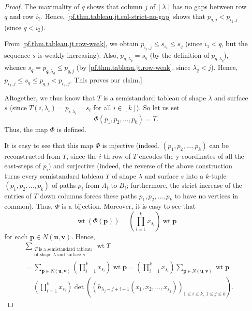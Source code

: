 \documentclass[reqno]{amsart}
\newcommand{\0}{\phantom{c}}
\let\sumnonlimits\sum
\let\prodnonlimits\prod
\renewcommand{\sum}{\sumnonlimits\limits}
\renewcommand{\prod}{\prodnonlimits\limits}
\theoremstyle{plain}
\theoremstyle{definition}
\numberwithin{equation}{section}
\begin{document}
\begin{proof}
The maximality of $q$ shows that column $j$ of $\left[  \lambda\right]  $ has
no gaps between row $q$ and row $i_{2}$. Hence,
\eqref{pf.thm.tableau.jt.col-strict-no-gap} shows that $p_{q,j}<p_{i_{2},j}$
(since $q<i_{2}$).

From \eqref{pf.thm.tableau.jt.row-weak}, we obtain $p_{i_{1},j}\leq s_{i_{1}%
}\leq s_{q}$ (since $i_{1}<q$, but the sequence $s$ is weakly increasing).
Also, $p_{q,\lambda_{q}}=s_{q}$ (by the definition of $p_{q,\lambda_{q}}$),
whence $s_{q}=p_{q,\lambda_{q}}\leq p_{q,j}$ (by
\eqref{pf.thm.tableau.jt.row-weak}, since $\lambda_{q}<j$). Hence,
$p_{i_{1},j}\leq s_{q}\leq p_{q,j}<p_{i_{2},j}$. This proves our claim.]

Altogether, we thus know that $T$ is a semistandard tableau of shape $\lambda$
and surface $s$ (since $T\left(  i,\lambda_{i}\right)  =p_{i,\lambda_{i}%
}=s_{i}$ for all $i\in\left[  k\right]  $). So let us set%
\[
\Phi\left(  p_{1},p_{2},\ldots,p_{k}\right)  =T.
\]
Thus, the map $\Phi$ is defined.

It is easy to see that this map $\Phi$ is injective (indeed, $\left(
p_{1},p_{2},\ldots,p_{k}\right)  $ can be reconstructed from $T$, since the
$i$-th row of $T$ encodes the y-coordinates of all the east-steps of $p_{i}$)
and surjective (indeed, the reverse of the above construction turns every
semistandard tableau $T$ of shape $\lambda$ and surface $s$ into a $k$-tuple
$\left(  p_{1},p_{2},\ldots,p_{k}\right)  $ of paths $p_{i}$ from $A_{i}$ to
$B_{i}$; furthermore, the strict increase of the entries of $T$ down columns
forces these paths $p_{1},p_{2},\ldots,p_{k}$ to have no vertices in common).
Thus, $\Phi$ is a bijection. Moreover, it is easy to see that
\[
\operatorname*{wt}\left(  \Phi\left(  \mathbf{p}\right)  \right)  =\left(
\prod_{i=1}^{k}x_{s_{i}}\right)  \operatorname*{wt}\mathbf{p}%
\]
for each $\mathbf{p}\in N\left(  \mathbf{u},\mathbf{v}\right)  $. Hence,%
\begin{align*}
&  \sum_{\substack{T\text{ is a semistandard tableau}\\\text{of shape }%
\lambda\text{ and surface }s}}\operatorname*{wt}T\\
&  =\sum_{\mathbf{p}\in N\left(  \mathbf{u},\mathbf{v}\right)  }\left(
\prod_{i=1}^{k}x_{s_{i}}\right)  \operatorname*{wt}\mathbf{p}=\left(
\prod_{i=1}^{k}x_{s_{i}}\right)  \sum_{\mathbf{p}\in N\left(  \mathbf{u}%
,\mathbf{v}\right)  }\operatorname*{wt}\mathbf{p}\\
&  =\left(  \prod_{i=1}^{k}x_{s_{i}}\right)  \det\left(  \left(
h_{\lambda_{j}-j+i-1}\left(  x_{1},x_{2},\ldots,x_{s_{j}}\right)  \right)
_{1\leq i\leq k,\ 1\leq j\leq k}\right)  .
\end{align*}

\end{proof}
\end{document}
